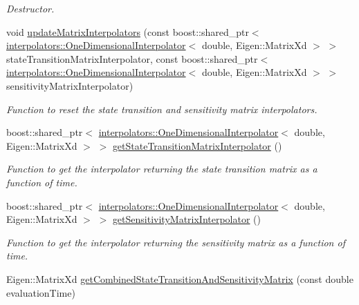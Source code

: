 \begin{DoxyCompactItemize}
\begin{DoxyCompactList}\small\item\em Destructor. \end{DoxyCompactList}\item 
void \hyperlink{classtudat_1_1propagators_1_1SingleArcCombinedStateTransitionAndSensitivityMatrixInterface_a04d2e1852ea8aa9f995c70e3bd64eaa9}{update\+Matrix\+Interpolators} (const boost\+::shared\+\_\+ptr$<$ \hyperlink{classtudat_1_1interpolators_1_1OneDimensionalInterpolator}{interpolators\+::\+One\+Dimensional\+Interpolator}$<$ double, Eigen\+::\+Matrix\+Xd $>$ $>$ state\+Transition\+Matrix\+Interpolator, const boost\+::shared\+\_\+ptr$<$ \hyperlink{classtudat_1_1interpolators_1_1OneDimensionalInterpolator}{interpolators\+::\+One\+Dimensional\+Interpolator}$<$ double, Eigen\+::\+Matrix\+Xd $>$ $>$ sensitivity\+Matrix\+Interpolator)
\begin{DoxyCompactList}\small\item\em Function to reset the state transition and sensitivity matrix interpolators. \end{DoxyCompactList}\item 
boost\+::shared\+\_\+ptr$<$ \hyperlink{classtudat_1_1interpolators_1_1OneDimensionalInterpolator}{interpolators\+::\+One\+Dimensional\+Interpolator}$<$ double, Eigen\+::\+Matrix\+Xd $>$ $>$ \hyperlink{classtudat_1_1propagators_1_1SingleArcCombinedStateTransitionAndSensitivityMatrixInterface_ae402a270cf9e35b6b4ed08f8456d01e8}{get\+State\+Transition\+Matrix\+Interpolator} ()
\begin{DoxyCompactList}\small\item\em Function to get the interpolator returning the state transition matrix as a function of time. \end{DoxyCompactList}\item 
boost\+::shared\+\_\+ptr$<$ \hyperlink{classtudat_1_1interpolators_1_1OneDimensionalInterpolator}{interpolators\+::\+One\+Dimensional\+Interpolator}$<$ double, Eigen\+::\+Matrix\+Xd $>$ $>$ \hyperlink{classtudat_1_1propagators_1_1SingleArcCombinedStateTransitionAndSensitivityMatrixInterface_ae05506d9c171a90ccc77015cd7d60b8b}{get\+Sensitivity\+Matrix\+Interpolator} ()
\begin{DoxyCompactList}\small\item\em Function to get the interpolator returning the sensitivity matrix as a function of time. \end{DoxyCompactList}\item 
Eigen\+::\+Matrix\+Xd \hyperlink{classtudat_1_1propagators_1_1SingleArcCombinedStateTransitionAndSensitivityMatrixInterface_aaeddcfa1c7e7ab77673d3ebf6e10b6f3}{get\+Combined\+State\+Transition\+And\+Sensitivity\+Matrix} (const double evaluation\+Time)

\end{DoxyCompactItemize}
